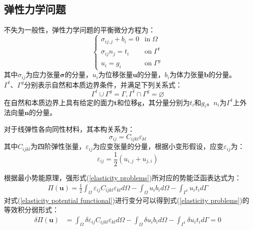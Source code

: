 \subsection{弹性力学问题}
不失为一般性，弹性力学问题的平衡微分方程为：
\begin{equation}\label{elasticity problems}
\begin{cases}
    \sigma_{ij,j}+b_i=0&\text{in}\;\Omega\\
    \sigma_{ij}n_j=t_i&\text{on}\;\Gamma^t\\
    u_i=g_i&\text{on}\;\Gamma^g
\end{cases}
\end{equation}
其中$\sigma_{ij}$为应力张量$\pmb \sigma$的分量，$u_i$为位移张量$\pmb{u}$的分量，$b_i$为体力张量$\pmb{b}$的分量。$\Gamma^t \text{、}\Gamma^g$分别表示自然和本质边界条件，并满足下列关系式：
\begin{equation}
\Gamma^t\cup \Gamma^g=\Gamma,\Gamma^t\cap \Gamma^g=\varnothing
\end{equation}
在自然和本质边界上具有给定的面力$\pmb{t}$和位移$\pmb{g}$，其分量分别为$t_i$和$g_i$。$n_i$为$\Gamma^{t}$上外法向量$\pmb{n}$的分量。\par
对于线弹性各向同性材料，其本构关系为：
\begin{equation}\label{constitutive relation}
    \sigma_{ij}=C_{ijkl}\varepsilon_{kl}
\end{equation}
其中$C_{ijkl}$为四阶弹性张量，$\varepsilon_{ij}$为应变张量的分量，根据小变形假设，应变$\varepsilon_{ij}$为：
\begin{equation}\label{CH2-strain}
    \varepsilon_{ij}=\frac{1}{2}(u_{i,j}+u_{j,i})
\end{equation} \par
根据最小势能原理，强形式(\ref{elasticity problems})所对应的势能泛函表达式为：
\begin{equation}\label{elasticity potential functional}
\begin{split}
    \Pi(\pmb{u})=\frac{1}{2}\int_{\Omega}\varepsilon_{ij}C_{ijkl}\varepsilon_{kl}d\Omega-\int_{\Omega}u_ib_id\Omega-\int_{\Gamma^t}u_it_id\Gamma
\end{split}
\end{equation}
对式(\ref{elasticity potential functional})进行变分可以得到式(\ref{elasticity problems})的等效积分弱形式：
\begin{equation}\label{elasticity weak form}
\begin{split}
    \delta\Pi(\pmb{u})&=\int_{\Omega}\delta\varepsilon_{ij}C_{ijkl}\varepsilon_{kl}d\Omega-\int_{\Omega}\delta u_ib_id\Omega-\int_{\Gamma^t}\delta u_it_id\Gamma=0
\end{split}
\end{equation}\par
